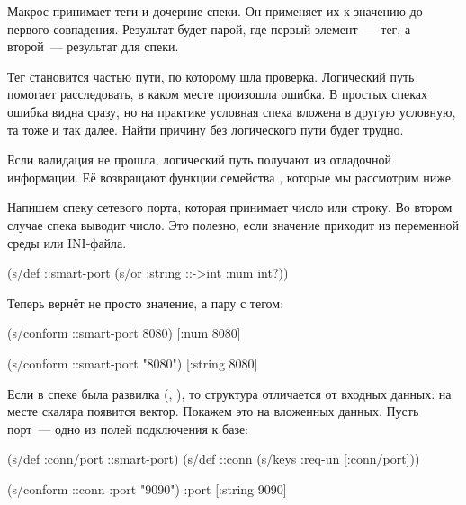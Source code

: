 Макрос  принимает теги и дочерние спеки. Он применяет их к значению
до первого совпадения. Результат будет парой, где первый элемент~--- тег, а
второй~--- результат  для спеки.

Тег становится частью пути, по которому шла проверка. Логический путь помогает
расследовать, в каком месте произошла ошибка. В простых спеках ошибка видна
сразу, но на практике условная спека вложена в другую условную, та тоже и так
далее. Найти причину без логического пути будет трудно.


Если валидация не прошла, логический путь получают из отладочной информации. Её
возвращают функции семейства , которые мы рассмотрим ниже.

Напишем спеку сетевого порта, которая принимает число или строку. Во втором
случае спека выводит число. Это полезно, если значение приходит из переменной
среды или INI-файла.


\begin{clojure}
(s/def ::smart-port
  (s/or :string ::->int :num int?))
\end{clojure}


\noindent
Теперь  вернёт не просто значение, а пару с тегом:


\begin{clojure}
(s/conform ::smart-port 8080)
[:num 8080]

(s/conform ::smart-port "8080")
[:string 8080]
\end{clojure}



Если в спеке была развилка (, ), то структура
 отличается от входных данных: на месте скаляра появится
вектор. Покажем это на вложенных данных. Пусть порт~--- одно из полей
подключения к базе:

\ifafive


\begin{clojure}
(s/def :conn/port ::smart-port)
(s/def ::conn
  (s/keys :req-un [:conn/port]))
\end{clojure}


\pagebreak


\begin{clojure}
(s/conform ::conn {:port "9090"})
{:port [:string 9090]}
\end{clojure}


\else


